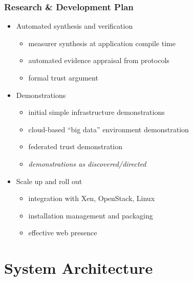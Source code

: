 \documentclass{beamer}
\begin{document}
\begin{frame}
  \frametitle{Research \& Development Plan}
  \begin{itemize}
  \item Automated synthesis and verification
    \begin{itemize}
    \item measurer synthesis at application compile time
    \item automated evidence appraisal from protocols
    \item formal trust argument
    \end{itemize}
  \item Demonstrations
    \begin{itemize}
    \item initial simple infrastructure demonstrations
    \item cloud-based ``big data'' environment demonstration
    \item federated trust demonstration
    \item \emph{demonstrations as discovered/directed}
    \end{itemize}
  \item Scale up and roll out
    \begin{itemize}
    \item integration with Xen, OpenStack, Linux
    \item installation management and packaging
    \item effective web presence
    \end{itemize}
  \end{itemize}
\end{frame}

\section{System Architecture}
\end{document}
